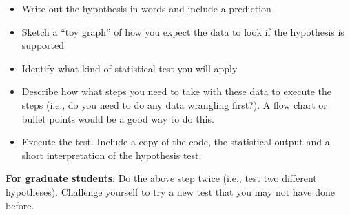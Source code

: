 \documentclass[
]{book}
\providecommand{\tightlist}{%
  \setlength{\itemsep}{0pt}\setlength{\parskip}{0pt}}
\begin{document}
\begin{itemize}
\tightlist
\item
  Write out the hypothesis in words and include a prediction
\item
  Sketch a ``toy graph'' of how you expect the data to look if the hypothesis is supported
\item
  Identify what kind of statistical test you will apply
\item
  Describe how what steps you need to take with these data to execute the steps (i.e., do you need to do any data wrangling first?). A flow chart or bullet points would be a good way to do this.
\item
  Execute the test. Include a copy of the code, the statistical output and a short interpretation of the hypothesis test.
\end{itemize}

\textbf{For graduate students}: Do the above step twice (i.e., test two different hypotheses). Challenge yourself to try a new test that you may not have done before.

  
\end{document}
